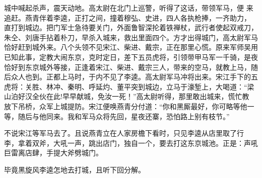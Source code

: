 城中喊起杀声，震天动地。高太尉在北门上巡警，听得了这话，带领军马，便
来追赶。燕青伴着李逵，正打之间，撞着穆弘、史进，四人各执枪捧，一齐助力，
直打到城边。把门军士急待要关门，外面鲁智深抡着铁禅杖，武行者使起双戒刀，
朱仝、刘唐手拈着朴刀，早杀入城来，救出里面四个。方才出得城门，高太尉军马
恰好赶到城外来。八个头领不见宋江、柴进、戴宗，正在那里心慌。原来军师吴用
已知此事，定教大闹东京，克时定日，差下五员虎将，引领带甲马军一千骑，是夜
恰好到东京城外等接，正逢着宋江、柴进、戴宗三人，带来的空马，就教上马，随
后众人也到。正都上马时，于内不见了李逵。高太尉军马冲将出来。宋江手下的五
虎将：关胜、林冲、秦明、呼延灼、董平突到城边，立马于濠堑上，大喝道：“梁
山泊好汉全伙在此!早早献城，免汝一死！”高太尉听得，那里敢出城来，慌忙教
放下吊桥，众军上城提防。宋江便唤燕青分付道：“你和黑厮最好，你可略等他一
等，随后与他同来。我和军马众将先回，星夜还寨，恐怕路上别有枝节。”

不说宋江等军马去了。且说燕青立在人家房檐下看时，只见李逵从店里取了行
李，拿着双斧，大吼一声，跳出店门，独自一个，要去打这东京城池。正是：声吼
巨雷离店肆，手提大斧劈城门。

毕竟黑旋风李逵怎地去打城，且听下回分解。